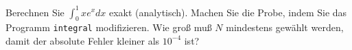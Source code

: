 \begin{aufg}[0]
Berechnen Sie $\int_0^1 xe^x dx$ exakt (analytisch). Machen Sie die
  Probe, indem Sie das Programm \lstinline!integral! modifizieren. Wie
  groß muß $N$ mindestens gewählt werden, damit der absolute Fehler
  kleiner als $10^{-4}$ ist?
\end{aufg}
